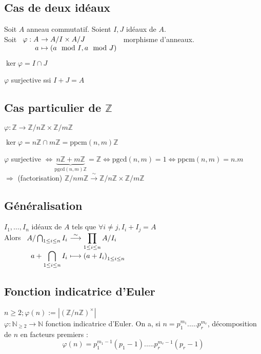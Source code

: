\documentclass[reqno,a4paper,10pt]{report}
\makeatletter
\newcommand{\underb}[2]{\underset{#1}{\underbrace{#2}}}
\newcommand{\IZ}{\ensuremath{\mathbb{Z}}\xspace} %
\newcommand{\IN}{\ensuremath{\mathbb{N}}\xspace} %
\newcommand{\soo}{\Longrightarrow}
\newcommand{\bij}{\overset{\!\sim}{\to}} %
\newcommand{\pgcd}{\mathrm{pgcd}} %
\newcommand{\ppcm}{\mathrm{ppcm}}
\let\oldenumerate=\enumerate%
\renewenvironment{enumerate}{%
    \oldenumerate%
  }{%
    \@noparlisttrue%
    \endlist%
  }%
\makeatother
\begin{document}
\subsection{Cas de deux idéaux}
Soit $A$ anneau commutatif. Soient $I, J$ idéaux de $A$.\\
Soit $\begin{array}[t]{r@{\ }l}
  \varphi : A &\to A/I \times A/J\\
  a &\mapsto (a \mod I, a \mod J)
\end{array}$ morphisme d'anneaux.
\begin{enumerate}[(i)]
  \item $\ker \varphi = I \cap J$
  \item $\varphi$ surjective ssi $I+J=A$
\end{enumerate}
\begin{comment}
  Preuve 29/10/08 p1
\end{comment}

\subsection{Cas particulier de $\IZ$}
$\varphi: \IZ \to \IZ/n\IZ \times \IZ/m\IZ$
\begin{enumerate}[1)]
  \item $\ker \varphi = n\IZ \cap m\IZ = \ppcm(n,m)\IZ$
  \item $\varphi$ surjective $\iff\underb{\pgcd(n,m)\IZ}{n\IZ+m\IZ}=\IZ \iff
    \pgcd(n,m)=1 \iff \ppcm(n,m)=n.m$\\
    $\soo$ (factorisation) $\IZ/nm\IZ \bij \IZ/n\IZ \times \IZ/m\IZ$
\end{enumerate}


\subsection{Généralisation}
$I_1, \dots, I_n$ idéaux de $A$ tels que $\forall i \neq j, I_i + I_j = A$\\
Alors $
\begin{array}[t]{r@{\ }l}
  A/\bigcap_{1\leq i \leq n} I_i &\displaystyle
  \overset{\sim}{\longrightarrow} \prod_{1 \leq i\leq n} A/I_i\\
  \displaystyle a+\bigcap_{1\leq i \leq n} I_i &\displaystyle \longmapsto
  \left( a+I_i \right)_{1\leq i \leq n}
\end{array}
$

\subsection{Fonction indicatrice d'Euler}
$n\geq 2; \varphi(n):=|(\IZ/n\IZ)^\times|$\\
$\varphi:\IN_{\geq 2} \longrightarrow \IN$ fonction indicatrice d'Euler.
On a, si $n=p_1^{m_1}. \dots . p_r^{m_r}$, décomposition de $n$ en facteurs
premiers :
\[\varphi(n)=p_1^{m_1-1}(p_1 - 1). \dots . p_r^{m_r-1}(p_r-1)\]
\begin{comment}
  Preuve Application du thm chinois généralisé, 29/10/08 p2
\end{comment}
\end{document}
